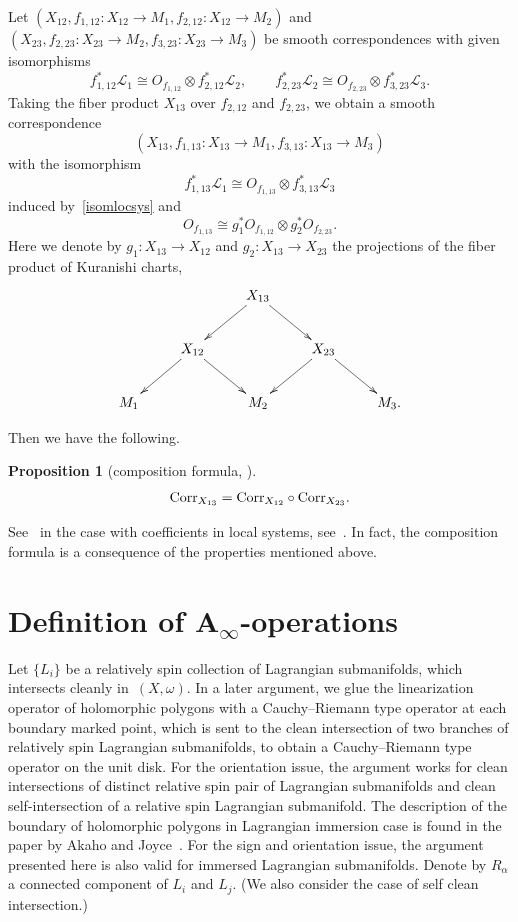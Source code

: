 \documentclass[pdftex]{sigma}
\numberwithin{equation}{section}
\newtheorem{prop}[thm]{Proposition}
\theoremstyle{definition}
\begin{document}
Let $(X_{12}, f_{1,12}\colon X_{12} \to M_1, f_{2,12}\colon X_{12} \to M_2)$ and
$(X_{23}, f_{2,23}\colon X_{23} \to M_2, f_{3,23}\colon X_{23} \to M_3)$ be smooth correspondences with given isomorphisms
\begin{equation}\label{isomlocsys}
f_{1,12}^* {\mathcal L}_1 \cong O_{f_{1,12}} \otimes f_{2,12}^* {\mathcal L}_2, \qquad
f_{2,23}^* {\mathcal L}_2 \cong O_{f_{2,23}} \otimes f_{3,23}^* {\mathcal L}_3.
\end{equation}
Taking the fiber product $X_{13}$ over $f_{2,12}$ and $f_{2,23}$,
we obtain a smooth correspondence
\[
(X_{13}, f_{1,13}\colon X_{13} \to M_1, f_{3,13}\colon X_{13} \to M_3)
\]
with the isomorphism
\[f_{1,13}^* {\mathcal L}_1 \cong O_{f_{1,13}} \otimes f_{3,13}^* {\mathcal L}_3\]
induced by~\eqref{isomlocsys} and
\[O_{f_{1,13}} \cong g_1^* O_{f_{1,12}} \otimes g_2^* O_{f_{2,23}}.\]
Here we denote by $g_1\colon X_{13} \to X_{12}$ and $g_2\colon X_{13} \to X_{23}$ the projections of the fiber product of Kuranishi charts,
\begin{equation*}
\xymatrix{
&& X_{13} \ar[ld]\ar[rd] \\
& X_{12} \ar[ld]\ar[rd] && X_{23}\ar[ld]\ar[rd] \\
M_1 && M_2 && M_3.}
\end{equation*}

Then we have the following.
\begin{prop}[composition formula, {\cite[Theorem 10.21]{FOOO20}}]%
\[{\rm Corr}_{X_{13}} = {\rm Corr}_{X_{12}} \circ {\rm Corr}_{X_{23}}.\]
\end{prop}

See~\cite[Chapter 27]{FOOO20} in the case with coefficients in local systems, see~\cite[Theorems~27.1 and~27.2]{FOOO20}.
In fact, the composition formula is a consequence of the properties mentioned above.


\section[Definition of A\_{infty}-operations]{Definition of $\boldsymbol{A_{\infty}}$-operations}

Let $\{L_i\}$ be a relatively spin collection of Lagrangian submanifolds, which intersects cleanly in~$(X, \omega)$.
In a later argument, we glue the linearization operator of holomorphic polygons with a Cauchy--Riemann type operator
at each boundary marked point, which is sent to the clean intersection of
two branches of relatively spin Lagrangian submanifolds, to obtain a Cauchy--Riemann type operator on the unit disk.
For the orientation issue, the argument works for clean intersections of distinct relative spin pair of Lagrangian submanifolds
and clean self-intersection of a relative spin Lagrangian submanifold.
The description of the boundary of holomorphic polygons in Lagrangian immersion case is found in the paper by Akaho and Joyce~\cite{AJ}.
For the sign and orientation issue, the argument presented here is also valid for immersed Lagrangian submanifolds.
Denote by $R_{\alpha}$ a connected component of $L_i$ and $L_j$. (We also consider the case of self clean intersection.)
\end{document}
